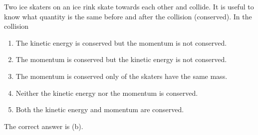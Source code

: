 
\begin{problem}[Robin2]
{Two ice skaters on an ice rink skate towards each other and collide. It is useful to know what quantity is the same before and after the collision (conserved). In the collision 
\begin{enumerate}
	\item The kinetic energy is conserved but the momentum is not conserved.
	\item The momentum is conserved but the kinetic energy is not conserved. \answer
	\item The momentum is conserved only of the skaters have the same mass.
	\item Neither the kinetic energy nor the momentum is conserved. 
	\item Both the kinetic energy and momentum are conserved.
\end{enumerate}
}
{}
{The correct answer is (b).  }
\end{problem}